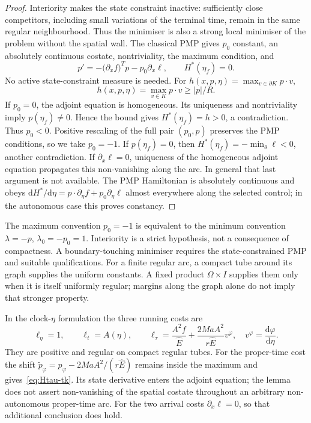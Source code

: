 \documentclass[12pt]{iopart}
\theoremstyle{plain}
\theoremstyle{definition}
\theoremstyle{remark}
\newcommand{\Ehat}{\hat E}
\newcommand{\dd}{\mathrm{d}}
\begin{document}
\begin{proof}
Interiority makes the state constraint inactive: sufficiently close
competitors, including small variations of the terminal time, remain
in the same regular neighbourhood. Thus the minimiser is also a strong
local minimiser of the problem without the spatial wall. The classical
PMP \cite{Pontryagin,Liberzon} gives $p_0$ constant, an absolutely
continuous costate, nontriviality, the maximum condition, and
\begin{equation}
 p'=-\big(\partial_x f\big)^{\!T}p-p_0\partial_x\ell,
 \qquad H^\ast(\eta_f)=0.
\end{equation}
No active state-constraint measure is needed. For
$h(x,p,\eta)=\max_{v\in\partial K}p\cdot v$,
\begin{equation}
 h(x,p,\eta)=\max_{v\in K}p\cdot v\ge |p|/R.
 \label{eq:normality-support}
\end{equation}
If $p_0=0$, the adjoint equation is homogeneous. Its uniqueness and
nontriviality imply $p(\eta_f)\ne0$. Hence the bound gives
$H^\ast(\eta_f)=h>0$, a contradiction. Thus $p_0<0$.
Positive rescaling of the full pair $(p_0,p)$ preserves the PMP
conditions, so we take $p_0=-1$. If $p(\eta_f)=0$, then
$H^\ast(\eta_f)=-\min_\theta\ell<0$, another contradiction.
If $\partial_x\ell=0$, uniqueness of the homogeneous adjoint equation
propagates this non-vanishing along the arc. In general that last
argument is not available. The PMP Hamiltonian is absolutely continuous
and obeys
$\dd H^\ast/\dd\eta=p\cdot\partial_\eta f+p_0\partial_\eta\ell$
almost everywhere along the selected control; in the autonomous case
this proves constancy.
\end{proof}

The maximum convention $p_0=-1$ is equivalent to the minimum convention
$\lambda=-p$, $\lambda_0=-p_0=1$. Interiority is a strict hypothesis,
not a consequence of compactness. A boundary-touching minimiser requires
the state-constrained PMP and suitable qualifications.
For a finite regular arc, a compact tube around its graph supplies the
uniform constants. A fixed product $\Omega\times I$ supplies them only
when it is itself uniformly regular; margins along the graph alone do
not imply that stronger property.

In the clock-$\eta$ formulation the three running costs are
\begin{equation}
 \ell_\eta=1,\qquad \ell_t=A(\eta),\qquad
 \ell_\tau=\frac{A^2f}{\Ehat}
       +\frac{2MaA^2}{r\Ehat}v^\varphi,
 \quad v^\varphi=\frac{\dd\varphi}{\dd\eta}.
\end{equation}
They are positive and regular on compact regular tubes.
For the proper-time cost the shift
$\tilde p_\varphi=p_\varphi-2MaA^2/(r\Ehat)$ remains inside the maximum
and gives~\eqref{eq:Htau-tk}. Its state derivative enters the adjoint
equation; the lemma does not assert non-vanishing of the spatial
costate throughout an arbitrary non-autonomous proper-time arc.
For the two arrival costs $\partial_x\ell=0$, so that additional
conclusion does hold.
\end{document}
